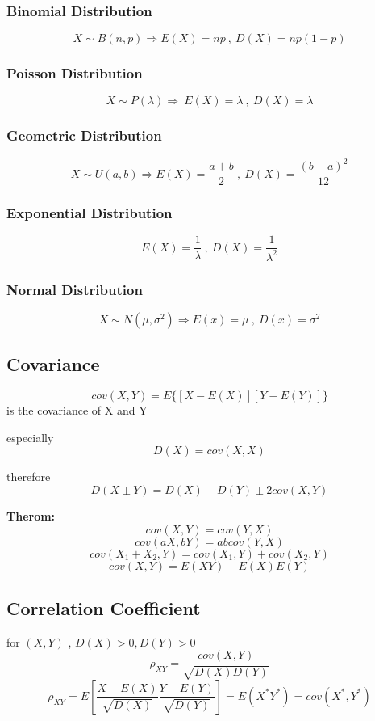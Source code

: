 \documentclass{ctexart}
\begin{document}
\subsubsection{Binomial Distribution}
\[X\sim B(n,p)\Rightarrow E(X)=np\ , \ D(X)=np(1-p)\]

\subsubsection{Poisson Distribution}

\[ X\sim P(\lambda)\Rightarrow \ E(X)=\lambda \ , \ D(X)=\lambda\]


\subsubsection{Geometric Distribution}

\[X\sim U(a,b) \Rightarrow E(X)=\frac{a+b}{2}\ , \ D(X)=\frac{(b-a)^2}{12}\]

\subsubsection{Exponential Distribution}
\[E(X)=\frac{1}{\lambda}\ , \  D(X)=\frac{1}{\lambda^2}\]

\subsubsection{Normal Distribution}
\[X\sim N(\mu,\sigma^2)\Rightarrow E(x)=\mu\ , \ D(x)=\sigma^2\]

\subsection{Covariance}
\[cov(X,Y)=E\{[X-E(X)][Y-E(Y)]\}\]
is the covariance of X and Y

especially
\[D(X)=cov(X,X)\]

therefore 
\[D(X\pm Y)=D(X)+D(Y)\pm 2cov(X,Y)\]

\vspace{12 pt}
\textbf{Therom:}
\[cov(X,Y)=cov(Y,X)\]
\[cov(aX,bY)=abcov(Y,X)\]
\[cov(X_1+X_2,Y)=cov(X_1,Y)+cov(X_2,Y)\]
\[cov(X,Y)=E(XY)-E(X)E(Y)\]

\subsection{Correlation Coefficient}
for \((X,Y)\) , \(D(X)>0,D(Y)>0\)
\[\rho_{XY}=\frac{cov(X,Y)}{\sqrt{D(X)D(Y)}}\]
\[\rho_{XY}=E[\frac{X-E(X)}{\sqrt{D(X)}}\frac{Y-E(Y)}{\sqrt{D(Y)}}]=E(X^*Y^*)=cov(X^*,Y^*)\]
\end{document}
